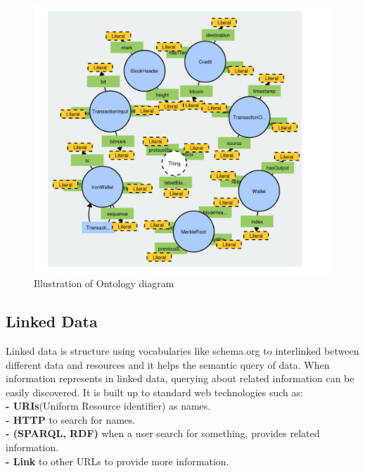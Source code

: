 \begin{center}
	
	
	\begin{figure}[htb!]
		
		\begin{minipage}{0.55\linewidth}
			\centering
			\includegraphics[width=1.65\textwidth]{images/chap02_diagram_ontology.png}
		\end{minipage}
		\caption[Illustration of Ontology diagram]{Illustration of Ontology diagram\cite{Matthew}}
		
		
	\end{figure}
	
\end{center}

\subsection{Linked Data}
Linked data is structure using vocabularies like schema.org to interlinked between different data and resources and it helps the semantic query of data. When information represents in linked data, querying about related information can be easily discovered. It is built up to standard web technologies such as:\\
\textbf{- URIs}(Uniform Resource identifier) as names.\\ 
\textbf{- HTTP} to search for names.\\
\textbf{- (SPARQL, RDF)}  when a user search for something, provides related information.\\
\textbf{- Link} to other URLs to provide more information\cite{Hector}.\\

